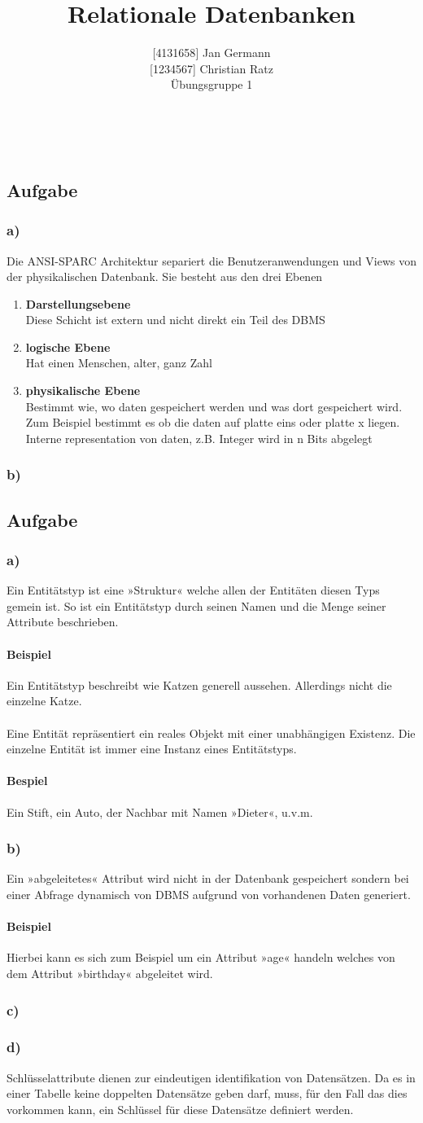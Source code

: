 \documentclass[11pt,a4paper,DIV=9]{scrartcl}
\author{{[}4131658{]} Jan Germann \\{[}1234567{]} Christian Ratz\\Übungsgruppe 1}
\title{Relationale Datenbanken}
\newcounter{temp}
\newcommand{\aufgabe}[1]{
  \setcounter{temp}{\value{subsection}}
  \setcounter{subsection}{#1}
  \addtocounter{subsection}{-1}
  \subsection{Aufgabe}
  \setcounter{subsection}{\value{temp}}
}
\newcommand{\teil}[2][]{
  \subsubsection*{#2) #1}
}
\renewcommand{\author}[1]{\renewcommand{\author}{#1}}
\renewcommand{\title}[1]{\renewcommand{\title}{#1}}
\newcommand{\makehomeworktitle}{
  \begin{minipage}[t]{6.5cm}
    \sf{\author}
  \end{minipage}
  \begin{minipage}[t]{6.5cm}
    \begin{flushright}
      \sf{\title\\\today}
    \end{flushright}
  \end{minipage}
  \\[0.2cm]
  \begin{center}
    \sf{
      \color{blue}{
        \LARGE{Aufgabenblatt \blattnr}
      }
    }
  \end{center}
  \vspace{0.1cm}
}
\begin{document}
\makehomeworktitle

\aufgabe{1}
\teil{a}
  Die ANSI-SPARC Architektur separiert die Benutzeranwendungen und Views von der physikalischen Datenbank. Sie besteht aus den drei Ebenen 
  \begin{enumerate}
    \item \textbf{Darstellungsebene} \\
      Diese Schicht ist extern und nicht direkt ein Teil des DBMS
    \item \textbf{logische Ebene} \\
      Hat einen Menschen,  alter, ganz Zahl 
    \item \textbf{physikalische Ebene} \\
      Bestimmt wie, wo daten gespeichert werden und was dort gespeichert wird. Zum Beispiel bestimmt es ob die daten auf platte eins oder platte x liegen. Interne representation von daten, z.B. Integer wird in n Bits abgelegt
    \end{enumerate}
\teil{b}

\aufgabe{2}
\teil{a}
  Ein Entitätstyp ist eine »Struktur« welche allen der Entitäten diesen Typs gemein ist. So ist ein Entitätstyp durch seinen Namen und die Menge seiner Attribute beschrieben.
  \paragraph{Beispiel} Ein Entitätstyp beschreibt  wie Katzen generell aussehen. Allerdings nicht die einzelne Katze.
  \paragraph{} Eine Entität repräsentiert ein reales Objekt mit einer unabhängigen Existenz. Die einzelne Entität ist immer eine Instanz eines Entitätstyps.
  \paragraph{Bespiel} Ein Stift, ein Auto, der Nachbar mit Namen »Dieter«, u.v.m.
\teil{b}
  Ein »abgeleitetes« Attribut wird nicht in der Datenbank gespeichert sondern bei einer Abfrage dynamisch von DBMS aufgrund von vorhandenen Daten generiert.
  \paragraph{Beispiel} Hierbei kann es sich zum Beispiel um ein Attribut »age« handeln welches von dem Attribut »birthday« abgeleitet wird.
\teil{c}
\teil{d}
  Schlüsselattribute dienen zur eindeutigen identifikation von Datensätzen. Da es in einer Tabelle keine doppelten Datensätze geben darf, muss, für den Fall das dies vorkommen kann, ein Schlüssel für diese Datensätze definiert werden.
\end{document}
